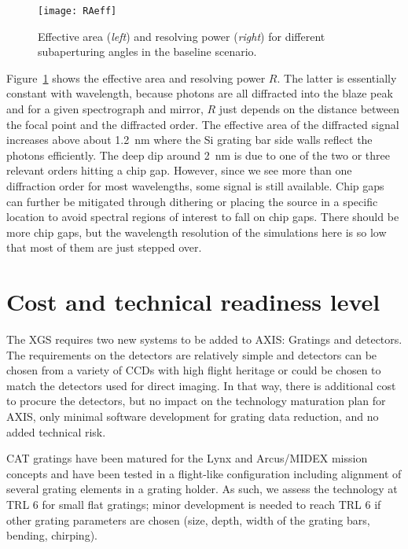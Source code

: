 \documentclass[12pt]{spieman}  %
\begin{document}
\begin{spacing}{1}
\begin{figure} [ht]
  \begin{center}
  \texttt{[image: RAeff]}
  \end{center}
  \caption {\label{fig:RAeff}
    Effective area (\emph{left}) and resolving power (\emph{right}) for different subaperturing angles in the baseline scenario.
  }
\end{figure}

Figure~\ref{fig:RAeff} shows the effective area and resolving power $R$. The latter is essentially constant with wavelength, because photons are all diffracted into the blaze peak and for a given spectrograph and mirror, $R$ just depends on the distance between the focal point and the diffracted order.
The effective area of the diffracted signal increases above about 1.2~nm where the Si grating bar side walls reflect the photons efficiently. The deep dip around 2~nm is due to one of the two or three relevant orders hitting a chip gap. However, since we see more than one diffraction order for most wavelengths, some signal is still available. Chip gaps can further be mitigated through dithering or placing the source in a specific location to avoid spectral regions of interest to fall on chip gaps. There should be more chip gaps, but the wavelength resolution of the simulations here is so low that most of them are just stepped over.


\section{Cost and technical readiness level}
The XGS requires two new systems to be added to AXIS: Gratings and detectors. The requirements on the detectors are relatively simple and detectors can be chosen from a variety of CCDs with high flight heritage or could be chosen to match the detectors used for direct imaging. In that way, there is additional cost to procure the detectors, but no impact on the technology maturation plan for AXIS, only minimal software development for grating data reduction, and no added technical risk.

CAT gratings have been matured for the Lynx and Arcus/MIDEX mission concepts and have been tested in a flight-like configuration including alignment of several grating elements in a grating holder\cite{2022ApJ...934..171H}. As such, we assess the technology at TRL 6 for small flat gratings; minor development is needed to reach TRL 6 if other grating parameters are chosen (size, depth, width of the grating bars, bending, chirping).


\end{spacing}
\end{document}
